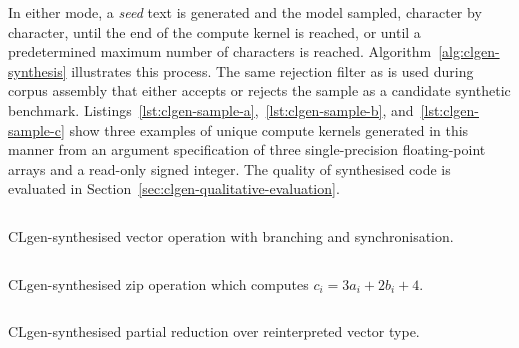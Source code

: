 In either mode, a \emph{seed} text is generated and the model sampled, character by character, until the end of the compute kernel is reached, or until a predetermined maximum number of characters is reached. Algorithm~\ref{alg:clgen-synthesis} illustrates this process. The same rejection filter as is used during corpus assembly that either accepts or rejects the sample as a candidate synthetic benchmark. Listings~\ref{lst:clgen-sample-a},~\ref{lst:clgen-sample-b}, and~\ref{lst:clgen-sample-c} show three examples of unique compute kernels generated in this manner from an argument specification of three single-precision floating-point arrays and a read-only signed integer. The quality of synthesised code is evaluated in Section~\ref{sec:clgen-qualitative-evaluation}.

\begin{algorithm}

\caption[Sampling a candidate kernel from a seed text]{}
\label{alg:clgen-synthesis}
\end{algorithm}

\begin{listing}
  \inputminted{opencl_lexer.py:OpenCLLexer -x}{lst/clgen-sample-a.cl}
  \caption[Synthesised vector operation with branching and synchronisation]{CLgen-synthesised vector operation with branching and synchronisation.}
  \label{lst:clgen-sample-a}
\end{listing}

\begin{listing}
  \inputminted{opencl_lexer.py:OpenCLLexer -x}{lst/clgen-sample-b.cl}
  \caption[Synthesised zip operation]{CLgen-synthesised zip operation which computes $c_i = 3a_i + 2b_i + 4$.}
  \label{lst:clgen-sample-b}
\end{listing}

\begin{listing}
  \inputminted{opencl_lexer.py:OpenCLLexer -x}{lst/clgen-sample-c.cl}
  \caption[Synthesised partial reduction operation]{CLgen-synthesised partial reduction over reinterpreted vector type.}
  \label{lst:clgen-sample-c}
\end{listing}
